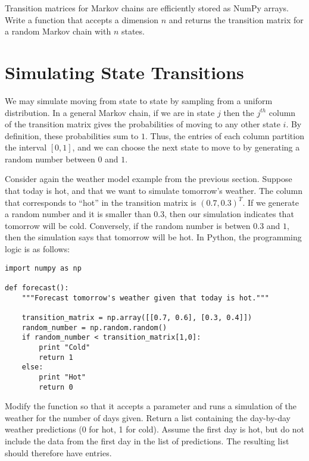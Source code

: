 \begin{problem}
Transition matrices for Markov chains are efficiently stored as NumPy arrays.
Write a function that accepts a dimension $n$ and returns the transition matrix for a random Markov chain with $n$ states.
\end{problem}

\section*{Simulating State Transitions}

We may simulate moving from state to state by sampling from a uniform distribution.
In a general Markov chain, if we are in state $j$ then the $j^{th}$ column of the transition matrix gives the probabilities of moving to any other state $i$.
By definition, these probabilities sum to $1$.
Thus, the entries of each column partition the interval $[0, 1]$, and we can choose the next state to move to by generating a random number between $0$ and $1$.

Consider again the weather model example from the previous section.
Suppose that today is hot, and that we want to simulate tomorrow's weather.
The column that corresponds to ``hot'' in the transition matrix is $(0.7, 0.3)^T$.
If we generate a random number and it is smaller than $0.3$, then our simulation indicates that tomorrow will be cold.
Conversely, if the random number is betwen $0.3$ and $1$, then the simulation says that tomorrow will be hot.
In Python, the programming logic is as follows:

\begin{lstlisting}
import numpy as np

def forecast():
	"""Forecast tomorrow's weather given that today is hot."""

	transition_matrix = np.array([[0.7, 0.6], [0.3, 0.4]])
	random_number = np.random.random()
	if random_number < transition_matrix[1,0]:
		print "Cold"
		return 1
	else:
		print "Hot"
		return 0
\end{lstlisting}

\begin{problem}
Modify the  function so that it accepts a parameter  and runs a simulation of the weather for the number of days given.
Return a list containing the day-by-day weather predictions (0 for hot, 1 for cold).
Assume the first day is hot, but do not include the data from the first day in the list of predictions.
The resulting list should therefore have  entries.
\end{problem}

